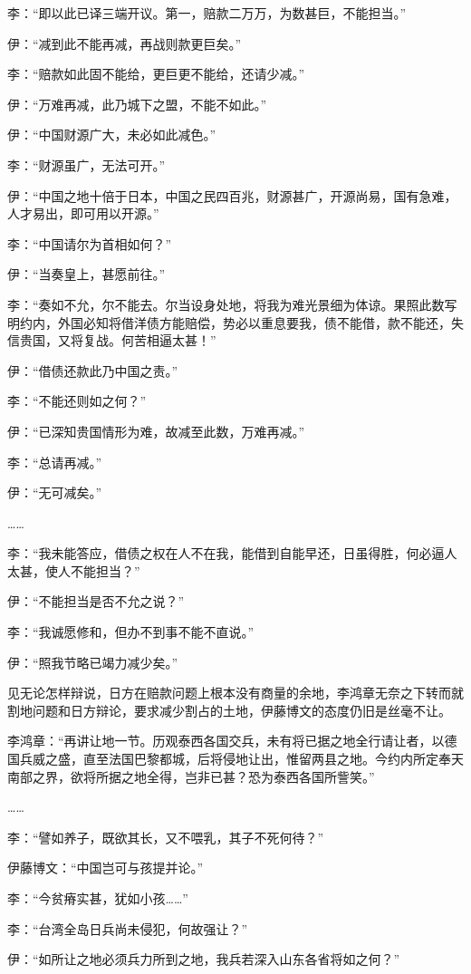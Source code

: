 \documentclass[12pt,UTF8]{ctexbook}
\begin{document}
李：“即以此已译三端开议。第一，赔款二万万，为数甚巨，不能担当。”

伊：“减到此不能再减，再战则款更巨矣。”

李：“赔款如此固不能给，更巨更不能给，还请少减。”

伊：“万难再减，此乃城下之盟，不能不如此。”

伊：“中国财源广大，未必如此减色。”

李：“财源虽广，无法可开。”

伊：“中国之地十倍于日本，中国之民四百兆，财源甚广，开源尚易，国有急难，人才易出，即可用以开源。”

李：“中国请尔为首相如何？”

伊：“当奏皇上，甚愿前往。”

李：“奏如不允，尔不能去。尔当设身处地，将我为难光景细为体谅。果照此数写明约内，外国必知将借洋债方能赔偿，势必以重息要我，债不能借，款不能还，失信贵国，又将复战。何苦相逼太甚！”

伊：“借债还款此乃中国之责。”

李：“不能还则如之何？”

伊：“已深知贵国情形为难，故减至此数，万难再减。”

李：“总请再减。”

伊：“无可减矣。”

……

李：“我未能答应，借债之权在人不在我，能借到自能早还，日虽得胜，何必逼人太甚，使人不能担当？”

伊：“不能担当是否不允之说？”

李：“我诚愿修和，但办不到事不能不直说。”

伊：“照我节略已竭力减少矣。”

见无论怎样辩说，日方在赔款问题上根本没有商量的余地，李鸿章无奈之下转而就割地问题和日方辩论，要求减少割占的土地，伊藤博文的态度仍旧是丝毫不让。

李鸿章：“再讲让地一节。历观泰西各国交兵，未有将已据之地全行请让者，以德国兵威之盛，直至法国巴黎都城，后将侵地让出，惟留两县之地。今约内所定奉天南部之界，欲将所据之地全得，岂非已甚？恐为泰西各国所訾笑。”

……

李：“譬如养子，既欲其长，又不喂乳，其子不死何待？”

伊藤博文：“中国岂可与孩提并论。”

李：“今贫瘠实甚，犹如小孩……”

李：“台湾全岛日兵尚未侵犯，何故强让？”

伊：“如所让之地必须兵力所到之地，我兵若深入山东各省将如之何？”
\end{document}
